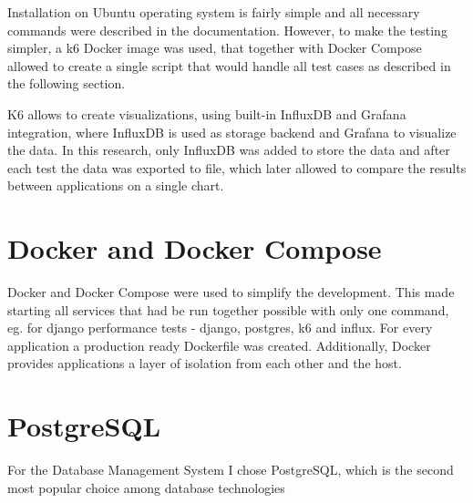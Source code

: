 Installation on Ubuntu operating system is fairly simple and all necessary commands were described in the documentation. However, to make the testing simpler, a k6 Docker image was used, that together with Docker Compose allowed to create a single script that would handle all test cases as described in the following section.

K6 allows to create visualizations, using built-in InfluxDB and Grafana integration, where InfluxDB is used as storage backend and Grafana to visualize the data. In this research, only InfluxDB was added to store the data and after each test the data was exported to file, which later allowed to compare the results between applications on a single chart.

\section{Docker and Docker Compose}

Docker and Docker Compose were used to simplify the development. This made starting all services that had be run together possible with only one command, eg. for django performance tests - django, postgres, k6 and influx. For every application a production ready Dockerfile was created. Additionally, Docker provides applications a layer of isolation from each other and the host.

\section{PostgreSQL}

For the Database Management System I chose PostgreSQL, which is the second most popular choice among database technologies %
